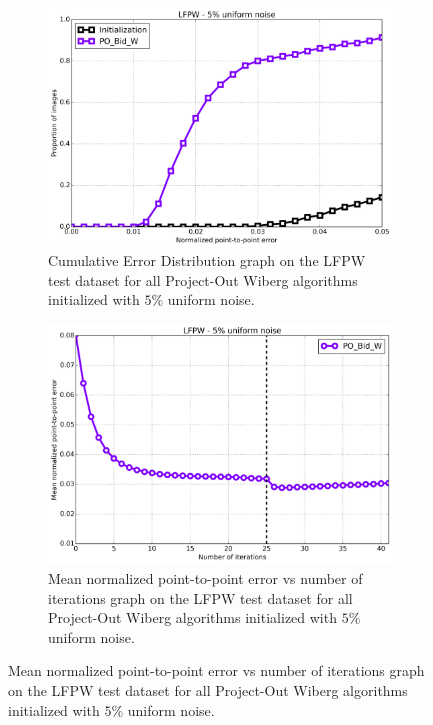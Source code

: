 \begin{figure}[h!]
	\centering
	\begin{subfigure}{0.48\textwidth}
	    \includegraphics[width=\textwidth]{experiments/algorithms/po_w/ced_po_w_5.png}
	    \caption{Cumulative Error Distribution graph on the LFPW test dataset for all Project-Out Wiberg algorithms initialized with $5\%$ uniform noise.}
	    \label{fig:ced_po_w_5}
	\end{subfigure}
	\hfill
	\begin{subfigure}{0.48\textwidth}
	    \includegraphics[width=\textwidth]{experiments/algorithms/po_w/mean_error_vs_iters_po_w_5.png}
	    \caption{Mean normalized point-to-point error vs number of iterations graph on the LFPW test dataset for all Project-Out Wiberg algorithms initialized with $5\%$ uniform noise.}
	    \label{fig:mean_error_vs_iters_po_w_5}

\end{subfigure}
\end{figure}
